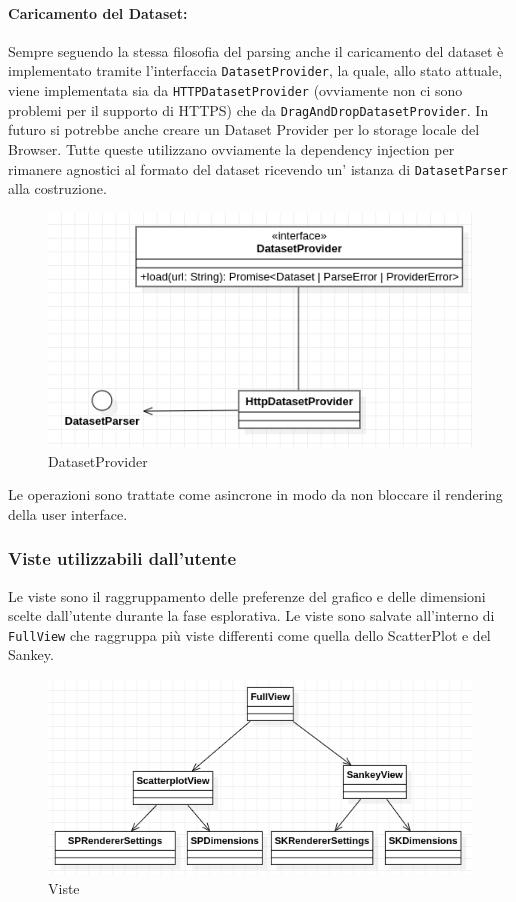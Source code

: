 \paragraph{Caricamento del Dataset:}
Sempre seguendo la stessa filosofia del parsing anche il caricamento del dataset
è implementato tramite l'interfaccia \texttt{DatasetProvider}, la quale, allo stato
attuale, viene implementata sia da \texttt{HTTPDatasetProvider} (ovviamente non ci
sono problemi per il supporto di HTTPS) che da \texttt{DragAndDropDatasetProvider}. In
futuro si potrebbe anche creare un Dataset Provider per lo storage locale del
Browser. Tutte queste utilizzano ovviamente la dependency injection per rimanere
agnostici al formato del dataset ricevendo un' istanza di \texttt{DatasetParser}
alla costruzione.
\begin{figure}[h!]
  \centering
  \includegraphics[scale=0.55]{../../assets/classi_uml/datasetprovider.png}
  \caption{DatasetProvider}
\end{figure}
Le operazioni sono trattate come asincrone in modo da non
bloccare il rendering della user interface.

\subsubsection{Viste utilizzabili dall'utente}
Le viste sono il raggruppamento delle preferenze del grafico e delle dimensioni
scelte dall'utente durante la fase esplorativa. Le viste sono salvate all'interno
di \texttt{FullView} che raggruppa più viste differenti come quella dello
ScatterPlot e del Sankey.
\begin{figure}[h!]
  \centering
  \includegraphics[scale=0.55]{../../assets/classi_uml/vister.png}
  \caption{Viste}
\end{figure}


